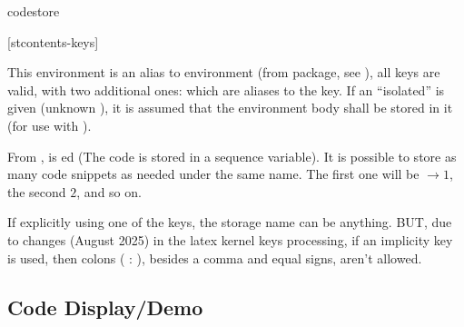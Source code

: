 \documentclass{article}
\begin{document}
\begin{codedescribe}[env]{codestore}
	\begin{codesyntax}
		\tsmacro{\begin{codestore}}[stcontents-keys]{}
    \tsmacro{\end{codestore}}{}
	\end{codesyntax}
This environment is an alias to  environment (from  package, see \cite{SCONTENTS}), all  keys are valid, with two additional ones:  which are aliases to the  key. If an ``isolated''  is given (unknown ), it is assumed that the environment body shall be stored in it (for use with \tsobj[code]{\tscode,\tsmergedcode,\tsdemo,\tsresult,\tsexec}).
\end{codedescribe}
\begin{tsremark}
  From ,  is ed (The code is stored in a sequence variable). It is possible to store as many code snippets as needed under the same name. The first one will be $\rightarrow 1$, the second $2$, and so on.
\end{tsremark}
\begin{tsremark}
  If explicitly using one of the  keys, the storage name can be anything. BUT, due to changes (August 2025) in the latex kernel keys processing, if an implicity key is used,  then colons ( : ), besides a comma and equal signs, aren't allowed.
\end{tsremark}




\subsection{Code Display/Demo}\label{codelist}
\end{document}
